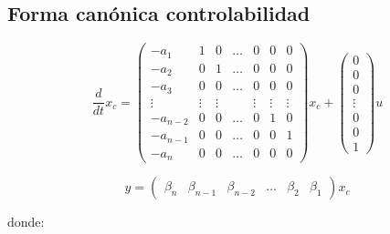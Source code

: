 
        \subsection{Forma canónica controlabilidad}

        \begin{equation}
            \frac{d}{dt} x_c =
            \begin{pmatrix}
            -a_{1} & 1 & 0 & \dots & 0 & 0 & 0 \\
            -a_{2} & 0 & 1 & \dots & 0 & 0 & 0 \\
            -a_{3} & 0 & 0 & \dots & 0 & 0 & 0 \\
            \vdots & \vdots & \vdots & & \vdots & \vdots & \vdots \\
            -a_{n-2} & 0 & 0 & \dots & 0 & 1 & 0 \\
            -a_{n-1} & 0 & 0 & \dots & 0 & 0 & 1 \\
            -a_{n} & 0 & 0 & \dots & 0 & 0 & 0
            \end{pmatrix} x_c +
            \begin{pmatrix}
            0 \\
            0 \\
            0 \\
            \vdots \\
            0 \\
            0 \\
            1
            \end{pmatrix} u
        \end{equation}

        \begin{equation}
            y =
            \begin{pmatrix}
                \beta_n & \beta_{n-1} & \beta_{n-2} & \dots & \beta_2 & \beta_1
            \end{pmatrix} x_c
        \end{equation}

        donde:

